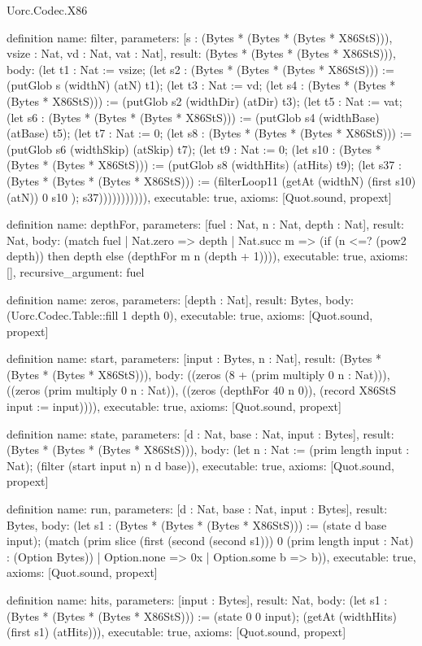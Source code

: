 \begin{lexlean}{Uorc.Codec.X86}
\begin{semanticmodule}
definition{
  name: filter,
  parameters: [s : (Bytes * (Bytes * (Bytes * X86StS))), vsize : Nat, vd : Nat, vat : Nat],
  result: (Bytes * (Bytes * (Bytes * X86StS))),
  body: (let t1 : Nat := vsize; (let s2 : (Bytes * (Bytes * (Bytes * X86StS))) := (putGlob s (widthN) (atN) t1); (let t3 : Nat := vd; (let s4 : (Bytes * (Bytes * (Bytes * X86StS))) := (putGlob s2 (widthDir) (atDir) t3); (let t5 : Nat := vat; (let s6 : (Bytes * (Bytes * (Bytes * X86StS))) := (putGlob s4 (widthBase) (atBase) t5); (let t7 : Nat := 0; (let s8 : (Bytes * (Bytes * (Bytes * X86StS))) := (putGlob s6 (widthSkip) (atSkip) t7); (let t9 : Nat := 0; (let s10 : (Bytes * (Bytes * (Bytes * X86StS))) := (putGlob s8 (widthHits) (atHits) t9); (let s37 : (Bytes * (Bytes * (Bytes * X86StS))) := (filterLoop11 (getAt (widthN) (first s10) (atN)) 0 s10 ); s37))))))))))),
  executable: true,
  axioms: [Quot.sound, propext]
}

definition{
  name: depthFor,
  parameters: [fuel : Nat, n : Nat, depth : Nat],
  result: Nat,
  body: (match fuel
    | Nat.zero => depth
    | Nat.succ m => (if (n <=? (pow2 depth)) then depth else (depthFor m n (depth + 1)))),
  executable: true,
  axioms: [],
  recursive_argument: fuel
}

definition{
  name: zeros,
  parameters: [depth : Nat],
  result: Bytes,
  body: (Uorc.Codec.Table::fill 1 depth 0),
  executable: true,
  axioms: [Quot.sound, propext]
}

definition{
  name: start,
  parameters: [input : Bytes, n : Nat],
  result: (Bytes * (Bytes * (Bytes * X86StS))),
  body: ((zeros (8 + (prim multiply 0 n : Nat))), ((zeros (prim multiply 0 n : Nat)), ((zeros (depthFor 40 n 0)), (record X86StS {input := input})))),
  executable: true,
  axioms: [Quot.sound, propext]
}

definition{
  name: state,
  parameters: [d : Nat, base : Nat, input : Bytes],
  result: (Bytes * (Bytes * (Bytes * X86StS))),
  body: (let n : Nat := (prim length input : Nat); (filter (start input n) n d base)),
  executable: true,
  axioms: [Quot.sound, propext]
}

definition{
  name: run,
  parameters: [d : Nat, base : Nat, input : Bytes],
  result: Bytes,
  body: (let s1 : (Bytes * (Bytes * (Bytes * X86StS))) := (state d base input); (match (prim slice (first (second (second s1))) 0 (prim length input : Nat) : (Option Bytes))
    | Option.none => 0x
    | Option.some b => b)),
  executable: true,
  axioms: [Quot.sound, propext]
}

definition{
  name: hits,
  parameters: [input : Bytes],
  result: Nat,
  body: (let s1 : (Bytes * (Bytes * (Bytes * X86StS))) := (state 0 0 input); (getAt (widthHits) (first s1) (atHits))),
  executable: true,
  axioms: [Quot.sound, propext]
}
\end{semanticmodule}
\end{lexlean}
